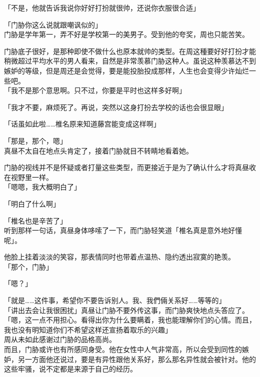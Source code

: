 「不是，他就告诉我说你好好打扮就很帅，还说你衣服很合适」

「门胁你这么说就跟嘲讽似的」\\

门胁是学年第一，弄不好是学校第一的美男子。受到他的夸奖，周也只能苦笑。

门胁底子很好，是那种即使不做什么也原本就帅的类型。在周这種要好好打扮才能稍微超过平均水平的男人看来，自然是非常羡慕门胁这种人。虽说这种羡慕达不到嫉妒的等级，但是周还是会觉得，要是能投胎投成那样，人生也会变得少许灿烂一些吧。\\

「我不是那个意思啊。只不过，你要是平时也这样多好啊」

「我才不要，麻烦死了。再说，突然以这身打扮去学校的话也会很显眼」

「话虽如此啦……椎名原来知道藤宫能变成这样啊」

「那是，那个，嗯」\\

真昼不太自在地点头肯定了，接着门胁就目不转睛地看着她。

门胁的视线并不是怀疑或者打量这些类型，而更接近于是为了确认什么才将真昼收在视野里一样。\\

「嗯嗯，我大概明白了」

「明白了什么啊」

「椎名也是辛苦了」\\

听到那样一句话，真昼身体哆嗦了一下，而门胁轻笑道「椎名真是意外地好懂呢」。

他脸上挂着淡淡的笑容，那表情同时也带着点温热、隐约透出寂寞的艳羡。\\

「那个，门胁」

「嗯？」

「就是……这件事，希望你不要告诉别人。我、我們倆关系好……等等的」\\

「讲出去会让我很困扰」真昼让门胁不要外传这事，而门胁爽快地点头答应了。\\

「嗯，这一点不用担心。看得出你为什么要瞒着，我也能理解你们的心情。而且，我也没有明知道你们不希望这样还宣扬着取乐的兴趣」\\

周从未如此感谢过门胁的品格高尚。\\

而且，门胁或许也有所感同身受。他在女性中人气非常高，所以会受到同性的嫉妒，另一方面他还说过，要是有异性跟他关系好，那么那名异性就会被针对。他的这些牢骚，说不定都是来源于自己的经历。\\

